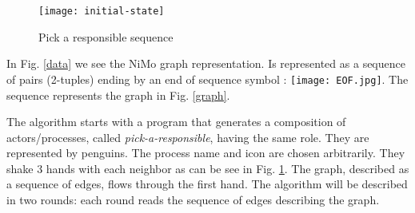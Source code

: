 \documentclass{article}                     \usepackage{graphics}
\begin{document}
 \begin{figure}[h]
	\centering
	\texttt{[image: initial-state]}
	\caption{Pick a responsible sequence}
	\label{Pick}
\end{figure}

In Fig. \ref{data} we see the NiMo graph representation.  Is represented as a sequence of pairs (2-tuples) ending by an end of sequence symbol : \texttt{[image: EOF.jpg]}.  The sequence represents the graph in Fig. \ref{graph}.

The algorithm starts with a program that generates a composition of  actors/processes, called \textit{pick-a-responsible}, having the same role. They are represented by penguins. The process name and icon are chosen arbitrarily. They  shake 3 hands with each neighbor as can be see in Fig. \ref{Pick}. The graph, described as a sequence of edges,  flows through the first hand. The algorithm will be described in two rounds: each round reads the sequence of edges describing the graph.
\end{document}
